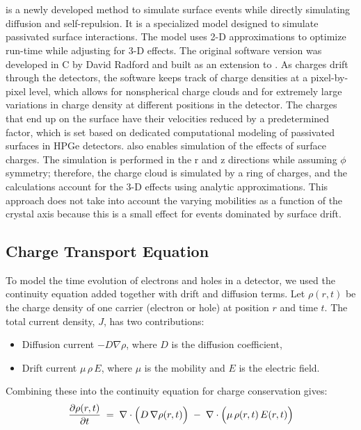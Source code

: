\section{{\ehd}}
{\ehd} is a newly developed method to simulate surface events while directly simulating diffusion and self-repulsion. It is a specialized model designed to simulate passivated surface interactions. The model uses 2-D approximations to optimize run-time while adjusting for 3-D effects. The original software version was developed in C by David Radford and built as an extension to {\siggen}. As charges drift through the detectors, the software keeps track of charge densities at a pixel-by-pixel level, which allows for nonspherical charge clouds and for extremely large variations in charge density at different positions in the detector. The charges that end up on the surface have their velocities reduced by a predetermined factor, which is set based on dedicated computational modeling of passivated surfaces in HPGe detectors. {\ehd} also enables simulation of the effects of surface charges. The simulation is performed in the r and z directions while assuming $\phi$ symmetry; therefore, the charge cloud is simulated by a ring of charges, and the calculations account for the 3-D effects using analytic approximations. This approach does not take into account the varying mobilities as a function of the crystal axis because this is a small effect for events dominated by surface drift.


\subsection{Charge Transport Equation}
\label{sec:charge_transport_eq}
To model the time evolution of electrons and holes in a detector, we used the continuity equation added together with drift and diffusion terms. Let $\rho(r,t)$ be the charge density of one carrier (electron or hole) at position $r$ and time $t$. The total current density, $J$, has two contributions: 

\begin{itemize}
  \item Diffusion current $-D\nabla \rho$, where $D$ is the diffusion coefficient,
  \item Drift current $\mu\,\rho\,E$, where $\mu$ is the mobility and $E$ is the electric field. 
\end{itemize}

Combining these into the continuity equation for charge conservation gives:
\begin{equation}
\label{ch3_eq_charge_transport}
\frac{\partial \rho(r,t)}{\partial t}
\;=\;
\nabla \cdot \Bigl(D\,\nabla\rho(r,t)\Bigr)
\;-\;
\nabla \cdot \Bigl(\mu\,\rho(r,t)\,{E}(r,t)\Bigr)
\end{equation}

